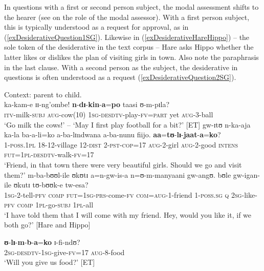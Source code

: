 In questions with a first or second person subject, the modal assessment shifts to the hearer (see \citealt{LehmannC2012} on the role of the modal assessor). With a first person subject, this is typically understood as a request for approval, as in (\ref{exDesiderativeQuestion1SG}). Likewise in (\ref{exDesiderativeHareHippo}) -- the sole token of the desiderative in the text corpus -- Hare asks Hippo whether the latter likes or dislikes the plan of visiting girls in town. Also note the paraphrasis in the last clause. With a second person as the subject, the desiderative in questions is often understood as a request (\ref{exDesiderativeQuestion2SG}). 
\begin{exe}
\ex \label{exDesiderativeQuestion1SG} Context: parent to child.\\
\gll ka-kam-e ɪɪ-ng'ombe! \textbf{n}-\textbf{dɪ}-\textbf{kin}-\textbf{a}=\textbf{po} taasi ʊ-m-pɪla?\\
\textsc{itv}-milk-\textsc{subj} \textsc{aug}-cow(10) \textsc{1sg}-\textsc{desdtv}-play-\textsc{fv}=\textsc{part} yet \textsc{aug}-3-ball\\
\glt `Go milk the cows!' -- \lq May I first play football for a bit?' [ET]
\ex \label{exDesiderativeHareHippo} \gll gw-ɪtʊ n-ka-aja ka-la ba-a-li=ko a-ba-lɪndwana a-ba-nunu fiijo. \textbf{aa}=\textbf{tʊ}-\textbf{lɪ}-\textbf{jaat}-\textbf{a}=\textbf{ko}?\\
1-\textsc{poss.1pl} 18-12-village 12-\textsc{dist} 2-\textsc{pst}-\textsc{cop}=17 \textsc{aug}-2-girl \textsc{aug}-2-good \textsc{intens} \textsc{fut}=\textsc{1pl}-\textsc{desdtv}-walk-\textsc{fv}=17\\ 
\glt `Friend, in that town there were very beautiful girls. Should we go and visit them?' 
\sn \gll  m-ba-bʊʊl-ile ʊkʊtɪ a=n-gw-is-a n=ʊ-m-manyaani gw-angʊ. bʊle gw-igan-ile ʊkutɪ tʊ-bʊʊk-e tw-esa?\\ %
\textsc{1sg}-2-tell-\textsc{pfv} \textsc{comp} \textsc{fut}=\textsc{1sg}-\textsc{prs}-come-\textsc{fv} \textsc{com}=\textsc{aug}-1-friend 1-\textsc{poss.sg} \textsc{q} \textsc{2sg}-like-\textsc{pfv} \textsc{comp} \textsc{1pl}-go-\textsc{subj} \textsc{1pl}-all\\
\glt \lq I have told them that I will come with my friend. Hey, would you like it, if we both go?' [Hare and Hippo]

\ex \label{exDesiderativeQuestion2SG}
\gll \textbf{ʊ}-\textbf{lɪ}-\textbf{m}-\textbf{b}-\textbf{a}=\textbf{ko} ɪ-fi-ndʊ?\\
\textsc{2sg}-\textsc{desdtv}-\textsc{1sg}-give-\textsc{fv}=17 \textsc{aug}-8-food\\
\glt \lq Will you give us food?' [ET]
\end{exe}

